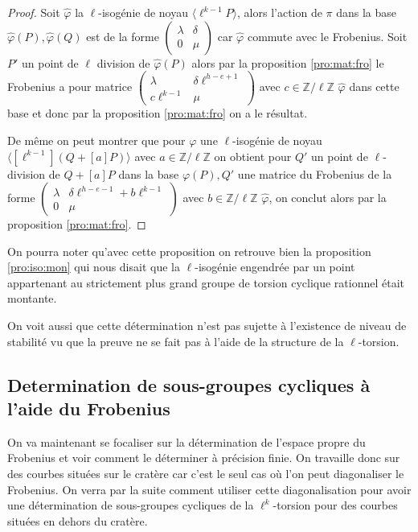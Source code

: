 \documentclass[10pt,a4paper]{book}
\theoremstyle{plain}
\theoremstyle{definition}
\theoremstyle{definition}
\theoremstyle{definition}
\theoremstyle{definition}
\theoremstyle{remark}
\theoremstyle{remark}
\theoremstyle{definition}
\begin{document}
\begin{proof}
Soit $\widehat{\varphi}$ la $\ell$-isogénie de noyau $\langle \ell^{k-1}P \rangle$, alors l'action de $\pi$ dans la base $\widehat{\varphi}(P), \widehat{\varphi}(Q)$ est de la forme $\left( \begin{smallmatrix} \lambda & \delta \\ 0 & \mu \end{smallmatrix} \right)$ car $\widehat{\varphi}$ commute avec le Frobenius. Soit $P'$ un point de $\ell$ division de $\widehat{\varphi}(P)$ alors par la proposition \ref{pro:mat:fro} le Frobenius a pour matrice $\left( \begin{smallmatrix} \lambda & \delta \ell^{h-e+1} \\ c \ell^{k-1} & \mu \end{smallmatrix} \right)$ avec $c \in \mathbb{Z}/\ell \mathbb{Z}$ $\widehat{\varphi}$ dans cette base et donc par la proposition \ref{pro:mat:fro} on a le résultat.

De même on peut montrer que pour $\varphi$ une $\ell$-isogénie de noyau $\langle [\ell^{k-1}](Q+[a]P) \rangle$ avec $a \in \mathbb{Z}/\ell \mathbb{Z}$ on obtient pour $Q'$ un point de $\ell$-division de $Q+[a]P$ dans la base $\varphi(P), Q'$ une matrice du Frobenius de la forme $\left( \begin{smallmatrix} \lambda & \delta \ell^{h-e-1}+b\ell^{k-1} \\ 0 & \mu \end{smallmatrix} \right)$ avec $b \in \mathbb{Z}/\ell \mathbb{Z}$ $\widehat{\varphi}$, on conclut alors par la proposition \ref{pro:mat:fro}.
\end{proof}


On pourra noter qu'avec cette proposition on retrouve bien la proposition \ref{pro:iso:mon} qui nous disait que la $\ell$-isogénie engendrée par un point appartenant au strictement plus grand groupe de torsion cyclique rationnel était montante.


On voit aussi que cette détermination n'est pas sujette à l'existence de niveau de stabilité vu que la preuve ne se fait pas à l'aide de la structure de la $\ell$-torsion.

\subsection{Determination de sous-groupes cycliques à l'aide du Frobenius}
\label{sub:ss-gr}
On va maintenant se focaliser sur la détermination de l'espace propre du Frobenius et voir comment le déterminer à précision finie. On travaille donc sur des courbes situées sur le cratère car c'est le seul cas où l'on peut diagonaliser le Frobenius. On verra par la suite comment utiliser cette diagonalisation pour avoir une détermination de sous-groupes cycliques de la $\ell^k$-torsion pour des courbes situées en dehors du cratère.
\end{document}
